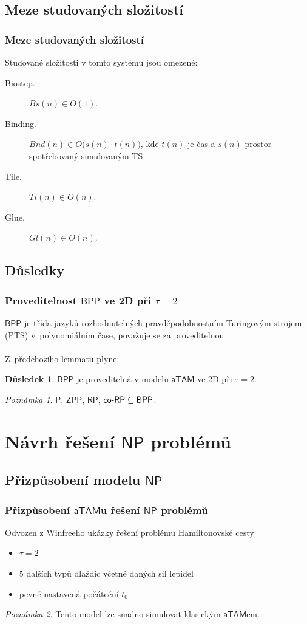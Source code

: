 \documentclass[10pt]{beamer}
\renewcommand{\P}{\mathsf{P}}
\newcommand{\NP}{\mathsf{NP}}
\newcommand{\RP}{\mathsf{RP}}
\newcommand{\coRP}{\mathsf{co}\textnormal{-}\mathsf{RP}}
\newcommand{\BPP}{\mathsf{BPP}}
\newcommand{\ZPP}{\mathsf{ZPP}}
\newcommand{\atam}{\mathsf{aTAM}}
\theoremstyle{definition}
\newtheorem{dusl}[tvr]{Důsledek}
\theoremstyle{remark}
\newtheorem{pozn}{Poznámka}
\begin{document}
\subsection{Meze studovaných složitostí}
\begin{frame}
\frametitle{Meze studovaných složitostí}
	\begin{lemma}
		Studované složitosti v tomto systému jsou omezené:
		\begin{description}
			\item[Biostep.] $Bs(n) \in O(1)$.
			\item[Binding.] $Bnd(n) \in O\bigl(s(n)\cdot t(n)\bigr)$, kde $t(n)$ je čas a $s(n)$ prostor spotřebovaný simulovaným TS.
			\item[Tile.] $Ti(n) \in O(n)$.
			\item[Glue.] $Gl(n) \in O(n)$.
		\end{description}
	\end{lemma}
\end{frame}

\subsection{Důsledky}
\begin{frame}
\frametitle{Proveditelnost $\BPP$ ve 2D při $\tau=2$}
	$\BPP$ je třída jazyků rozhodnutelných pravděpodobnostním Turingovým strojem (PTS) v~polynomiálním čase, považuje se za proveditelnou\\
	~\\
	Z~předchozího lemmatu plyne:
	\begin{dusl}
		$\BPP$ je proveditelná v modelu $\atam$ ve 2D při $\tau=2$.
	\end{dusl}
	\begin{pozn}
		$\P$, $\ZPP$, $\RP$, $\coRP \subseteq \BPP$.
	\end{pozn}
\end{frame}

\section{Návrh řešení $\NP$ problémů}
\subsection{Přizpůsobení modelu $\NP$}
\begin{frame}
\frametitle{Přizpůsobení $\atam$u řešení $\NP$ problémů}
	Odvozen z Winfreeho ukázky řešení problému Hamiltonovské cesty
	\begin{itemize}
		\item $\tau=2$
		\item $5$ dalších typů dlaždic včetně daných sil lepidel
		\item pevně nastavená počáteční $t_0$
	\end{itemize}
	\begin{pozn}
		Tento model lze snadno simulovat klasickým $\atam$em.
	\end{pozn}
\end{frame}
\end{document}

